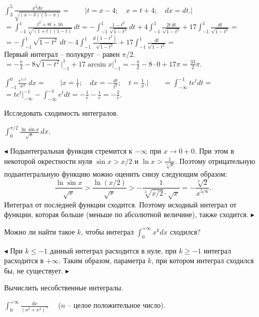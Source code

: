 \documentclass[a5paper,10pt]{article}
\begin{document}
\medskip
{} $\displaystyle \int_3^5\frac{x^2dx}{\sqrt{(x-3)(5-x)}}=
\qquad\Big|t=x-4;\quad x=t+4;\quad dx=dt.\Big|$\\
$\displaystyle =\int_{-1}^1\frac{t^2+8t+16}{\sqrt{(1+t)(1-t)}}\,dt=
-\int_{-1}^1\frac{1-t^2}{\sqrt{1-t^2}}\,dt
+4\int_{-1}^1\frac{2t\,dt}{\sqrt{1-t^2}}+17\int_{-1}^1\frac{dt}{\sqrt{1-t^2}}=$\\
$\displaystyle =-\int_{-1}^1\sqrt{1-t^2}\,dt
-4\int_{-1}^1\frac{d(1-t^2)}{\sqrt{1-t^2}}+17\int_{-1}^1\frac{dt}{\sqrt{1-t^2}}=$\\
Первый интеграл -- полукруг -- равен $\pi/2.$\\
$\displaystyle =-\frac{\pi}{2}-8\sqrt{1-t^2}\Big|_{-1}^1+17\arcsin x\Big|_{-1}^1=
-\frac{\pi}{2}-8\cdot0+17\pi=\frac{33}{2}\pi.$

\medskip
{} $\displaystyle \int_{-1}^0\frac{e^{1/x}}{x^3}\,dx=\qquad \Big| x=\frac 1t;\quad
dx=-\frac{dt}{t^2};\quad t=\frac 1x.\Big|\qquad=\int_{-\infty}^{-1}te^tdt=$\\
$\displaystyle =te^t\Big|_{-\infty}^{-1}-\int_{-\infty}^{-1}e^tdt=-\frac 1e-\frac 1e=-\frac 2e$.

\bigskip\noindent Исследовать сходимость интегралов.

\medskip
{} $\displaystyle \int_0^{\pi/2}\frac{\ln\sin x}{\sqrt x}\,dx$.

\smallskip
\noindent $\blacktriangleleft$ Подынтегральная функция стремится к $-\infty$ при $x\to0+0$.
При этом в некоторой окрестности нуля $\sin x>x/2$ и $\displaystyle \ln x>\frac{1}{\sqrt[3]x}$.
Поэтому отрицательную подынтегральную функцию можно оценить снизу следующим
образом: $$\displaystyle \frac{\ln\sin x}{\sqrt x}>\frac{\ln(x/2)}{\sqrt x}>-\frac{1}{\sqrt[3]{ x/2}\cdot\sqrt x}=-\frac{\sqrt[3]2}{x^{5/6}}.$$
Интеграл от последней функции сходится. Поэтому исходный интеграл от функции, которая больше  (меньше по абсолютной величине), также сходится. $\blacktriangleright$

\medskip
{} Можно ли найти такое $k$, чтобы интеграл
$\displaystyle \int_{0}^{+\infty}x^kdx$ сходился?

\smallskip
\noindent $\blacktriangleleft$ При $k\le-1$ данный интеграл расходится в нуле,
при $k\ge-1$ интеграл расходится в $+\infty$. Таким образом, параметра $k$, при
котором интеграл сходился бы, не существует. $\blacktriangleright$

\bigskip\noindent Вычислить несобственные интегралы.

\medskip
{} $\displaystyle \int_{0}^{+\infty}\frac{dx}{(a^2+x^2)^n}\quad$ ($n$ -- целое
положительное число).
\end{document}
